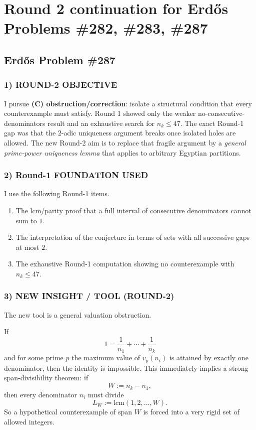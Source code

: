 \section*{Round 2 continuation for Erd\H{o}s Problems \#282, \#283, \#287}

\subsection*{Erd\H{o}s Problem \#287}

\subsubsection*{1) ROUND-2 OBJECTIVE}
I pursue \textbf{(C) obstruction/correction}: isolate a structural condition that every counterexample must satisfy. Round 1 showed only the weaker no-consecutive-denominators result and an exhaustive search for $n_k\le 47$. The exact Round-1 gap was that the $2$-adic uniqueness argument breaks once isolated holes are allowed. The new Round-2 aim is to replace that fragile argument by a \emph{general prime-power uniqueness lemma} that applies to arbitrary Egyptian partitions.

\subsubsection*{2) Round-1 FOUNDATION USED}
I use the following Round-1 items.
\begin{enumerate}
\item The lcm/parity proof that a full interval of consecutive denominators cannot sum to $1$.
\item The interpretation of the conjecture in terms of sets with all successive gaps at most $2$.
\item The exhaustive Round-1 computation showing no counterexample with $n_k\le 47$.
\end{enumerate}

\subsubsection*{3) NEW INSIGHT / TOOL (ROUND-2)}
The new tool is a general valuation obstruction.

If
\[
1=\frac1{n_1}+\cdots+\frac1{n_k}
\]
and for some prime $p$ the maximum value of $v_p(n_i)$ is attained by exactly one denominator, then the identity is impossible. This immediately implies a strong span-divisibility theorem: if
\[
W:=n_k-n_1,
\]
then every denominator $n_i$ must divide
\[
L_W:=\mathrm{lcm}(1,2,\dots,W).
\]
So a hypothetical counterexample of span $W$ is forced into a very rigid set of allowed integers.

